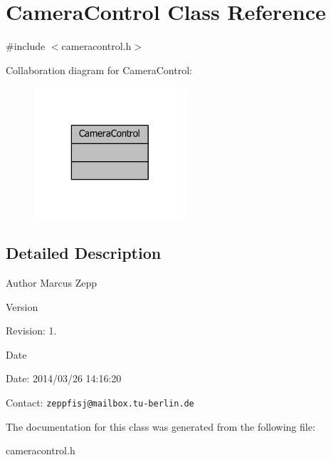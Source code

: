 \section{Camera\-Control Class Reference}
\label{classCameraControl}


{\ttfamily \#include $<$cameracontrol.\-h$>$}



Collaboration diagram for Camera\-Control\-:
\nopagebreak
\begin{figure}[H]
\begin{center}
\leavevmode
\includegraphics[width=160pt]{df/d8f/classCameraControl__coll__graph}
\end{center}
\end{figure}


\subsection{Detailed Description}
\begin{DoxyAuthor}{Author}
Marcus Zepp
\end{DoxyAuthor}
\begin{DoxyVersion}{Version}

\end{DoxyVersion}
\begin{DoxyParagraph}{Revision\-:}
1. 
\end{DoxyParagraph}


\begin{DoxyDate}{Date}

\end{DoxyDate}
\begin{DoxyParagraph}{Date\-:}
2014/03/26 14\-:16\-:20 
\end{DoxyParagraph}


Contact\-: {\tt zeppfisj@mailbox.\-tu-\/berlin.\-de} 

The documentation for this class was generated from the following file\-:\begin{DoxyCompactItemize}
\item 
cameracontrol.\-h\end{DoxyCompactItemize}
